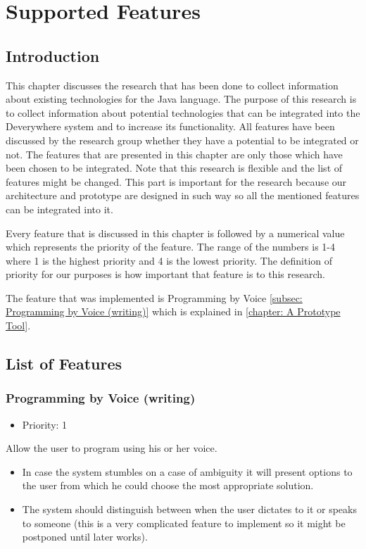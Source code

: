 \chapter{Supported Features} \label{chapter: Supported Features}
\section{Introduction}
This chapter discusses the research that has been done to collect information about existing technologies for the Java language. The purpose of this research is to collect information about potential technologies that can be integrated into the Deverywhere system and to increase its functionality. All features have been discussed by the research group whether they have a potential to be integrated or not. The features that are presented in this chapter are only those which have been chosen to be integrated. Note that this research is flexible and the list of features might be changed. This part is important for the research because our architecture and prototype are designed in such way so all the mentioned features can be integrated into it.

Every feature that is discussed in this chapter is followed by a numerical value which represents the priority of the feature. The range of the numbers is 1-4 where 1 is the highest priority and 4 is the lowest priority. The definition of priority for our purposes is how important that feature is to this research.

The feature that was implemented is Programming by Voice \autoref{subsec: Programming by Voice (writing)} which is explained in \autoref{chapter: A Prototype Tool}.

\section{List of Features}
\subsection{Programming by Voice (writing)} \label{subsec: Programming by Voice (writing)}
\begin{itemize}
	\item Priority: 1
\end{itemize}
Allow the user to program using his or her voice.
\begin{itemize}
	\item In case the system stumbles on a case of ambiguity it will present options to the user from which he could choose the most appropriate solution.
	\item The system should distinguish between when the user dictates to it or speaks to someone (this is a very complicated feature to implement so it might be postponed until  later works).
\end{itemize}
